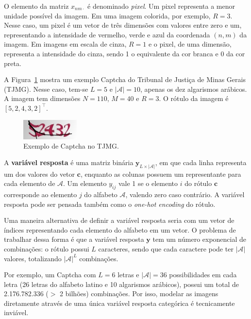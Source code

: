 \documentclass[12pt,twoside,brazilian]{book}
\begin{document}
O elemento da matriz \(x_{nm\cdot}\) é denominado \emph{pixel}. Um pixel
representa a menor unidade possível da imagem. Em uma imagem colorida,
por exemplo, \(R=3\). Nesse caso, um pixel é um vetor de três dimensões
com valores entre zero e um, representando a intensidade de vermelho,
verde e azul da coordenada \((n, m)\) da imagem. Em imagens em escala de
cinza, \(R=1\) e o pixel, de uma dimensão, representa a intensidade do
cinza, sendo 1 o equivalente da cor branca e 0 da cor preta.

A Figura~\ref{fig-exemplo-tjmg} mostra um exemplo Captcha do Tribunal de
Justiça de Minas Gerais (TJMG). Nesse caso, tem-se \(L=5\) e
\(|\mathcal A|=10\), apenas os dez algarismos arábicos. A imagem tem
dimensões \(N=110\), \(M=40\) e \(R=3\). O rótulo da imagem é
\([5,2,4,3,2]^\top\).

\begin{figure}

{\centering \includegraphics[width=1.14583in,height=\textheight]{./assets/img/tjmg16283c1e6d06.jpeg}

}

\caption{\label{fig-exemplo-tjmg}Exemplo de Captcha no TJMG.}

\end{figure}

A \textbf{variável resposta} é uma matriz binária
\(\mathbf y_{L \times |\mathcal A|}\), em que cada linha representa um
dos valores do vetor \(\mathbf c\), enquanto as colunas possuem um
representante para cada elemento de \(\mathcal A\). Um elemento
\(y_{ij}\) vale 1 se o elemento \(i\) do rótulo \(\mathbf c\)
corresponde ao elemento \(j\) do alfabeto \(\mathcal A\), valendo zero
caso contrário. A variável resposta pode ser pensada também como o
\emph{one-hot encoding} do rótulo.

Uma maneira alternativa de definir a variável resposta seria com um
vetor de índices representando cada elemento do alfabeto em um vetor. O
problema de trabalhar dessa forma é que a variável resposta
\(\mathbf y\) tem um número exponencial de combinações: o rótulo possui
\(L\) caracteres, sendo que cada caractere pode ter \(|\mathcal A|\)
valores, totalizando \(|\mathcal A|^L\) combinações.

Por exemplo, um Captcha com \(L=6\) letras e \(|\mathcal A| = 36\)
possibilidades em cada letra (26 letras do alfabeto latino e 10
algarismos arábicos), possui um total de 2.176.782.336 (\(>\) 2 bilhões)
combinações. Por isso, modelar as imagens diretamente através de uma
única variável resposta categórica é tecnicamente inviável.
\end{document}
